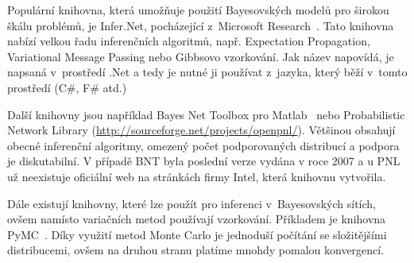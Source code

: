Populární knihovna, která umožňuje použití Bayesovských modelů pro širokou škálu problémů, je Infer.Net, pocházející z~Microsoft Research~\cite{InferNET12}.
Tato knihovna nabízí velkou řadu inferenčních algoritmů, např. Expectation Propagation, Variational Message Passing nebo Gibbsovo vzorkování.
Jak název napovídá, je napsaná v~prostředí .Net a tedy je nutné ji používat z~jazyka, který běží v~tomto prostředí (C\#, F\# atd.)

Další knihovny jsou například Bayes Net Toolbox pro Matlab~\cite{bnl} nebo Probabilistic Network Library (\url{http://sourceforge.net/projects/openpnl/}).
Většinou obsahují obecné inferenční algoritmy, omezený počet podporovaných distribucí a podpora je diskutabilní.
V případě BNT byla poslední verze vydána v roce 2007 a u PNL už neexistuje oficiální web na stránkách firmy Intel, která knihovnu vytvořila.

Dále existují knihovny, které lze použít pro inferenci v~Bayesovských sítích, ovšem namísto variačních metod používají vzorkování.
Příkladem je knihovna PyMC~\cite{patil2010pymc}. 
Díky využití metod Monte Carlo je jednoduší počítání se složitějšími distribucemi, ovšem na druhou stranu platíme mnohdy pomalou konvergencí.
